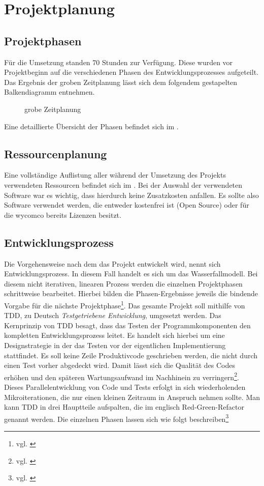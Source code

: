 \section{Projektplanung} 
\label{sec:Projektplanung}
\subsection{Projektphasen}
\label{sec:Projektphasen}
Für die Umsetzung standen 70 Stunden zur Verfügung. Diese wurden vor Projektbeginn auf die verschiedenen Phasen des Entwicklungsprozesses aufgeteilt. 
Das Ergebnis der groben Zeitplanung lässt sich dem folgendem gestapelten Balkendiagramm entnehmen. 
\begin{figure}[htb]
\centering
{}
\caption{grobe Zeitplanung}
\end{figure}
Eine detaillierte Übersicht der Phasen befindet sich im .
\subsection{Ressourcenplanung}
\label{sec:Ressourcenplanung}

Eine vollständige Auflistung aller während der Umsetzung des Projekts verwendeten Ressourcen befindet sich im . Bei der Auswahl der verwendeten Software war es wichtig, dass hierdurch keine Zusatzkosten anfallen. Es sollte also Software verwendet werden, die entweder kostenfrei ist (\zB Open Source) oder für die wycomco bereits Lizenzen besitzt.
\subsection{Entwicklungsprozess}
\label{sec:Entwicklungsprozess}
Die Vorgehensweise nach dem das Projekt entwickelt wird, nennt sich Entwicklungsprozess. In diesem Fall handelt es sich um das Wasserfallmodell.
Bei diesem nicht iterativen, linearen Prozess werden die einzelnen Projektphasen schrittweise bearbeitet. Hierbei bilden die Phasen-Ergebnisse jeweils die bindende Vorgabe für die nächste Projektphase\footnote{vgl. \cite[S. 263]{ItHandbuch}}.
Das gesamte Projekt soll mithilfe von \ac{TDD}, zu Deutsch \textit{Testgetriebene Entwicklung}, umgesetzt werden. Das Kernprinzip von \ac{TDD} besagt, dass das Testen der Programmkomponenten den kompletten Entwicklungsprozess leitet.
Es handelt sich hierbei um eine Designstrategie in der das Testen vor der eigentlichen Implementierung stattfindet. Es soll keine Zeile Produktivcode geschrieben werden, die nicht durch einen Test vorher abgedeckt wird.
Damit lässt sich die Qualität des Codes erhöhen und den späteren Wartungsaufwand im Nachhinein zu verringern\footnote{vgl. \cite{datenschutzbeauftragter}}.
Dieses Parallelentwicklung von Code und Tests erfolgt in sich wiederholenden Mikroiterationen, die nur einen kleinen Zeitraum in Anspruch nehmen sollte. Man kann \acs{TDD} in drei Hauptteile aufspalten, die im englisch Red-Green-Refactor genannt werden. 
Die einzelnen Phasen lassen sich wie folgt beschreiben\footnote{vgl. \cite{tddwiki}}

